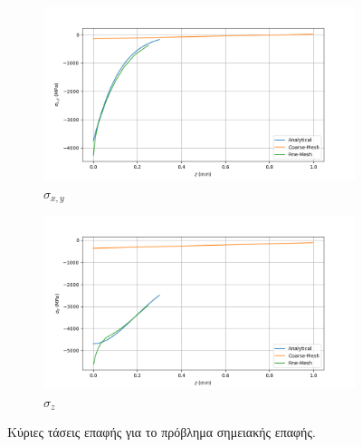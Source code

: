 \documentclass{article}
\begin{document}
\begin{figure}[H]
    \centering
    \begin{subfigure}{0.49\linewidth}
        \centering
        \includegraphics[width=\linewidth]{media/sxp.png}
        \caption{$\sigma_{x,y}$}
    \end{subfigure}
    \hfill
    \begin{subfigure}{0.49\linewidth}
        \centering
        \includegraphics[width=\linewidth]{media/szp.png}
        \caption{$\sigma_{z}$}
    \end{subfigure}
    \caption{Κύριες τάσεις επαφής για το πρόβλημα σημειακής επαφής.}
    \label{fig:b4}
\end{figure}




\listoffigures
\listoftables
\end{document}
